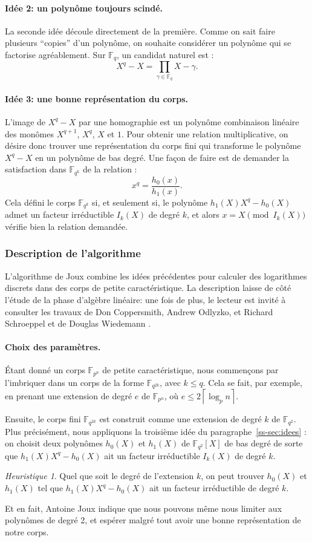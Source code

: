 \documentclass[a4paper, titlepage, 11pt]{article}
\theoremstyle{definition}
\theoremstyle{remark}
\newtheorem{heur}[theo]{Heuristique}
\def\gf #1{\mathbb{F}_{#1}}
\def\ceil #1{\left\lceil#1\right\rceil}
\begin{document}
\paragraph{Idée 2: un polynôme toujours scindé.} La seconde idée découle directement de la première. Comme on sait faire plusieurs ``copies'' d'un polynôme, on souhaite considérer un polynôme qui se factorise agréablement. Sur $\gf{q}$, un candidat naturel est : $$X^q -X = \prod_{\gamma\in\gf{q}} X-\gamma.$$

\paragraph{Idée 3: une bonne représentation du corps.} L'image de $X^q-X$ par une homographie est un polynôme combinaison linéaire des monômes $X^{q+1}$, $X^q$, $X$ et $1$. Pour obtenir une relation multiplicative, on désire donc trouver une représentation du corps fini qui transforme le polynôme $X^q - X$ en un polynôme de bas degré. Une façon de faire est de demander la satisfaction dans $\gf{q^k}$ de la relation :
$$x^q = \frac{h_0(x)}{h_1(x)}.$$
Cela défini le corps $\gf{q^k}$ si, et seulement si, le polynôme $h_1(X)X^q - h_0(X)$ admet un facteur irréductible $I_k(X)$ de degré $k$, et alors $x = X \pmod{I_k(X)}$ vérifie bien la relation demandée.

\subsubsection{Description de l'algorithme}

L'algorithme de Joux combine les idées précédentes pour calculer des logarithmes discrets dans des corps de petite caractéristique. La description laisse de côté l'étude de la phase d'algèbre linéaire: une fois de plus, le lecteur est invité à consulter les travaux de Don Coppersmith, Andrew Odlyzko, et Richard Schroeppel \cite{coppersmith1986} et de Douglas Wiedemann \cite{wiedemann1986}.

\paragraph{Choix des paramètres.}Étant donné un corps $\gf{p^n}$ de petite caractéristique, nous commençons par l'imbriquer dans un corps de la forme $\gf{q^{2k}}$, avec $k \leqslant q$. Cela se fait, par exemple, en prenant une extension de degré $e$ de $\gf{p^n}$, où $e \leqslant 2 \ceil{\log_p n}$.

Ensuite, le corps fini $\gf{q^{2k}}$ est construit comme une extension de degré $k$ de $\gf{q^2}$. Plus précisément, nous appliquons la troisième idée du paragraphe~\ref{ss-sec:idees} : on choisit deux polynômes $h_0(X)$ et $h_1(X)$ de $\gf{q^2}[X]$ de bas degré de sorte que $h_1(X)X^q - h_0(X)$ ait un facteur irréductible $I_k(X)$ de degré $k$.
\begin{heur}
Quel que soit le degré de l'extension $k$, on peut trouver $h_0(X)$ et $h_1(X)$  tel que $h_1(X)X^q - h_0(X)$ ait un facteur irréductible de degré $k$.
\end{heur}
Et en fait, Antoine Joux \cite{joux2013} indique que nous pouvons même nous limiter aux polynômes de degré 2, et espérer malgré tout avoir une bonne représentation de notre corps.
\end{document}
